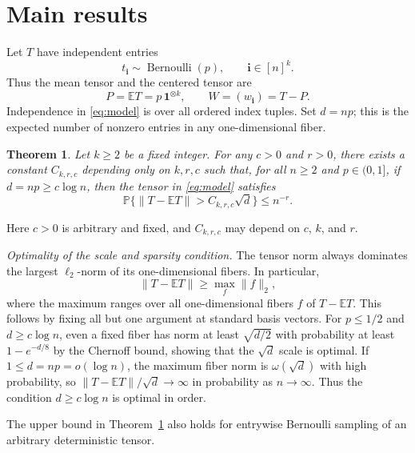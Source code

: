 \documentclass[10pt,a4paper]{amsart}
\numberwithin{equation}{section}
\newtheorem{theorem}{Theorem}[section]
\newcommand{\E}{\mathbb E}
\newcommand{\Pp}{\mathbb P}
\newcommand{\one}{\mathbf 1}
\begin{document}
\section{Main results}\label{sec:main}

Let $T$ have independent entries
\begin{equation}\label{eq:model}
 t_{\mathbf i}\sim\operatorname{Bernoulli}(p),
 \qquad \mathbf i\in[n]^k.
\end{equation}
Thus the mean tensor and the centered tensor are
\[
 P=\E T=p\,\one^{\otimes k},
 \qquad W=(w_{\mathbf i})=T-P.
\]
Independence in \eqref{eq:model} is over all ordered index tuples.
Set $d=np$; this is the expected number of nonzero entries in any
one-dimensional fiber.


\begin{theorem}\label{thm:main}
Let $k\ge2$ be a fixed integer. For any $c>0$ and $r>0$, there exists a
constant $C_{k,r,c}$ depending only on $k,r,c$ such that, for all
$n\ge2$ and $p\in(0,1]$, if $ d=np\ge c\log n$,  then the tensor in \eqref{eq:model} satisfies
\begin{equation}\label{eq:main}
 \Pp\{\|T-\E T\|>C_{k,r,c}\sqrt d\}\le n^{-r}.
\end{equation}
\end{theorem}


Here $c>0$ is arbitrary and fixed, and $C_{k,r,c}$ may depend on $c$,
$k$, and $r$.

\medskip
\noindent\textit{Optimality of the scale and sparsity condition.}
The tensor norm always dominates the largest $\ell_2$-norm of its
one-dimensional fibers. In particular,
\[
 \|T-\E T\|\ge\max_f\|f\|_2,
\]
where the maximum ranges over all one-dimensional fibers $f$ of
$T-\E T$. This follows by fixing all but one argument at standard
basis vectors. For $p\le1/2$ and $d\ge c\log n$, even a fixed fiber
has norm at least $\sqrt{d/2}$ with probability at least
$1-e^{-d/8}$ by the Chernoff bound, showing that the $\sqrt d$ scale
is optimal. If $1\le d=np=o(\log n)$, the maximum fiber norm is
$\omega(\sqrt d)$ with high probability, so
$\|T-\E T\|/\sqrt d\to\infty$ in probability as $n\to\infty$.
Thus the condition $d\ge c\log n$ is optimal in order.


\bigskip 

The upper bound in Theorem~\ref{thm:main} also holds for entrywise
Bernoulli sampling of an arbitrary
deterministic tensor. 
\end{document}
